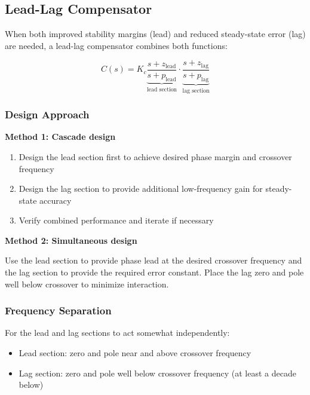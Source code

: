 \subsection{Lead-Lag Compensator}
\label{subsec:lead_lag}

When both improved stability margins (lead) and reduced steady-state error (lag) are needed, a lead-lag compensator combines both functions:

\begin{equation}
\boxed{C(s) = K_c \underbrace{\frac{s + z_{\text{lead}}}{s + p_{\text{lead}}}}_{\text{lead section}} \cdot \underbrace{\frac{s + z_{\text{lag}}}{s + p_{\text{lag}}}}_{\text{lag section}}}
\label{eq:lead_lag}
\end{equation}

\subsubsection{Design Approach}

\textbf{Method 1: Cascade design}
\begin{enumerate}
    \item Design the lead section first to achieve desired phase margin and crossover frequency
    \item Design the lag section to provide additional low-frequency gain for steady-state accuracy
    \item Verify combined performance and iterate if necessary
\end{enumerate}

\textbf{Method 2: Simultaneous design}

Use the lead section to provide phase lead at the desired crossover frequency and the lag section to provide the required error constant. Place the lag zero and pole well below crossover to minimize interaction.

\subsubsection{Frequency Separation}

For the lead and lag sections to act somewhat independently:
\begin{itemize}
    \item Lead section: zero and pole near and above crossover frequency
    \item Lag section: zero and pole well below crossover frequency (at least a decade below)
\end{itemize}

